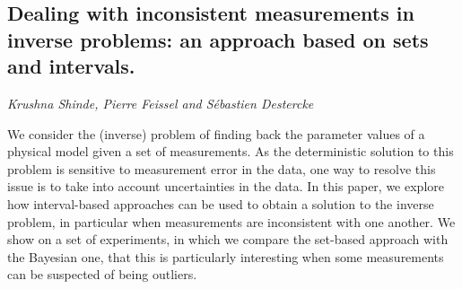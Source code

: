 \documentclass[../booklet.tex]{subfiles}
\begin{document}
\subsection[Dealing with inconsistent measurements in inverse problems: an approach based on sets and intervals.. {\it Krushna Shinde, Pierre Feissel and Sébastien Destercke}]{Dealing with inconsistent measurements in inverse problems: an approach based on sets and intervals.}
  

\begin{center}
  {\it Krushna Shinde, Pierre Feissel and Sébastien Destercke}
\end{center}



We consider the (inverse) problem of finding back the parameter values of a physical model given a set of measurements. As the deterministic solution to this problem is sensitive to measurement error in the data, one way to resolve this issue is to take into account uncertainties in the data. In this paper, we explore how interval-based approaches can be used to obtain a solution to the inverse problem, in particular when measurements are inconsistent with one another. We show on a set of experiments, in which we compare the set-based approach with the Bayesian one, that this is particularly interesting when some measurements can be suspected of being outliers.  
\end{document}
